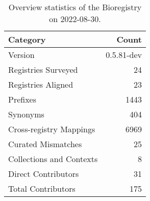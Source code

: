 \begin{table}
\centering
\caption{Overview statistics of the Bioregistry on 2022-08-30.}
\label{tab:bioregistry-summary}
\begin{tabular}{lr}
\toprule
                Category &      Count \\
\midrule
                 Version & 0.5.81-dev \\
     Registries Surveyed &         24 \\
      Registries Aligned &         23 \\
                Prefixes &       1443 \\
                Synonyms &        404 \\
 Cross-registry Mappings &       6969 \\
      Curated Mismatches &         25 \\
Collections and Contexts &          8 \\
     Direct Contributors &         31 \\
      Total Contributors &        175 \\
\bottomrule
\end{tabular}
\end{table}

